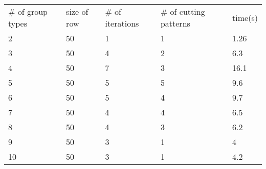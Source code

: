 \begin{table}[ht]
  \begin{tabular}{l|l|l|l|l}
  \hline
  \# of group types & size of row & \# of iterations & \# of cutting patterns & time(s) \\
  2  & 50  & 1 & 1 & 1.26 \\
  3  & 50  & 4 & 2 & 6.3 \\
  4  & 50  & 7 & 3 & 16.1 \\
  5  & 50  & 5 & 5 & 9.6 \\
  6  & 50  & 5 & 4 & 9.7 \\
  7  & 50  & 4 & 4 & 6.5 \\
  8  & 50 & 4 & 3 & 6.2 \\
  9  & 50 & 3 & 1 & 4 \\
  10 & 50 & 3 & 1 & 4.2 \\
  \hline
  \end{tabular}
\end{table}






